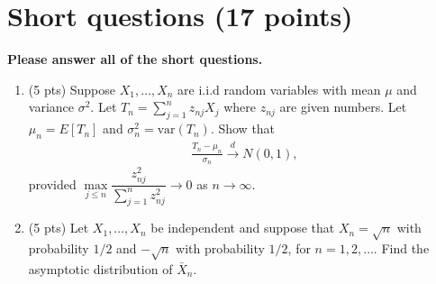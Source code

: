 \documentclass[12pt]{article}
\newcommand{\rd}{\color{red}}
\newcommand{\bk}{\color{black}}
\newcommand{\var}{\mbox{var}}
\newcommand{\cd}{\stackrel{d}{\rightarrow}}
\begin{document}
	\section{Short questions (17 points)}
	\textbf{Please answer all of the short questions.}
	\begin{enumerate}	
		
	\iffalse
	\item (7 pts) Let $X_1, X_2, \dots , X_n$ be
	i.i.d. samples of random variable with density $f$ on the real line. A standard estimate
	of $f$ is the kernel density estimate 
	\begin{align*}
	\hat{f}(x)=\frac{1}{nh}\sum_{i=1}^nK\left(\frac{x-X_i}{h}\right)
	\end{align*}
	where $K:\Re\rightarrow [0,\infty)$ is a kernel function satisfying $\int_{-\infty}^\infty K(t)dt=1$, and $h$ is a bandwidth parameter. We will measure the quality of $\hat{f}$ using
	$\|\hat{f}-f\|_1:=\int_{-\infty}^\infty |\hat{f}(t)-f(t)|dt.$
	Prove that:
	$$	P(\|\hat{f}-f\|_1\geq E\|\hat{f}-f\|_1+\delta)\leq e^{-cn\delta^2},$$
	where $c$ is some constant.
\fi
	\item (5 pts) 
Suppose $X_1,\dots,X_n$ are i.i.d random variables with mean $\mu$ and variance $\sigma^2$. Let $T_n=\sum_{j=1}^nz_{nj}X_j$ where $z_{nj}$ are given numbers. Let $\mu_n=E[T_n]$ and $\sigma_n^2=\var(T_n)$. Show that 
\begin{align*}
\frac{T_n-\mu_n}{\sigma_n}\cd N(0,1),
\end{align*}
provided  $\max\limits_{j\leq n}\dfrac{z_{nj}^2}{\sum_{j=1}^nz_{nj}^2}\rightarrow 0$  as  $n\rightarrow\infty$.
\item (5 pts)  Let $X_1,\dots,X_n$ be independent and suppose that $X_n=\sqrt{n}$ with probability $1/2$ and $-\sqrt{n}$ with probability $1/2$, for $n=1,2,\dots$. Find the asymptotic distribution of $\bar{X}_n$. 
	\bk


\end{enumerate}
\end{document}
